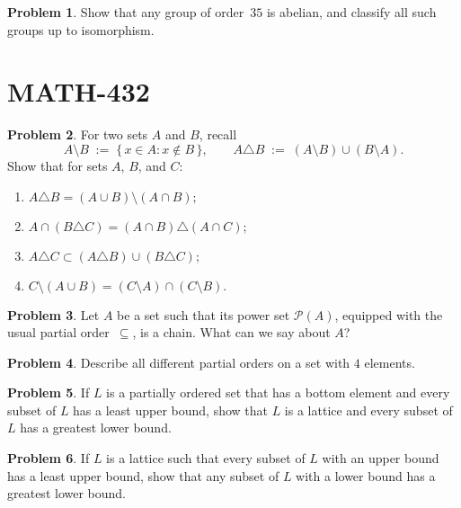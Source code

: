\documentclass[10pt]{article}
\theoremstyle{definition} %
\newtheorem{problem}{Problem}
\theoremstyle{plain} %
\begin{document}
\begin{problem}
  Show that any group of order $35$ is abelian, and classify all such groups up to isomorphism.
\end{problem}
\pagebreak
  \section{MATH-432}
  \begin{problem}
    For two sets $A$ and $B$, recall
    \[
        A \setminus B \;:=\; \{\,x \in A : x \notin B\,\},
        \qquad
        A \triangle B \;:=\; (A \setminus B) \cup (B \setminus A).
    \]
    Show that for sets $A$, $B$, and $C$:
    \begin{enumerate}[label=(\alph*)]
        \item $A \triangle B = (A \cup B) \setminus (A \cap B);$
        \item $A \cap (B \triangle C) = (A \cap B) \triangle (A \cap C);$
        \item $A \triangle C \subset (A \triangle B) \cup (B \triangle C);$
        \item $C \setminus (A \cup B) = (C \setminus A) \cap (C \setminus B).$
    \end{enumerate}
\end{problem}

\begin{problem}
    Let $A$ be a set such that its power set $\mathcal{P}(A)$, equipped with the usual partial order~$\subseteq$, is a chain.
    What can we say about $A$?
\end{problem}

\begin{problem}
    Describe all different partial orders on a set with $4$ elements.
\end{problem}

\begin{problem}
    If $L$ is a partially ordered set that has a bottom element and every subset of $L$ has a least upper bound, show that $L$ is a lattice and every subset of $L$ has a greatest lower bound.
\end{problem}

\begin{problem}
    If $L$ is a lattice such that every subset of $L$ with an upper bound has a least upper bound, show that any subset of $L$ with a lower bound has a greatest lower bound.
\end{problem}
\end{document}
